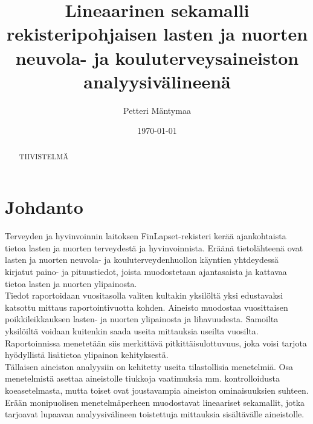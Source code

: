 \documentclass[finnish]{docopts}
\begin{document}
\singlespacing

\title{Lineaarinen sekamalli rekisteripohjaisen lasten ja nuorten neuvola- ja kouluterveysaineiston analyysivälineenä}
\author{Petteri Mäntymaa}
\date{\today}

\maketitle




\begin{abstract}

TIIVISTELMÄ

\end{abstract}

\mytableofcontents

\section{Johdanto}
\label{sec:johdanto}

Terveyden ja hyvinvoinnin laitoksen FinLapset-rekisteri \cite{finlapsetrekisteri} kerää ajankohtaista tietoa lasten ja nuorten terveydestä ja hyvinvoinnista. Eräänä tietolähteenä ovat lasten ja nuorten neuvola- ja kouluterveydenhuollon käyntien yhtdeydessä kirjatut paino- ja pituustiedot, joista muodostetaan ajantasaista ja kattavaa tietoa lasten ja nuorten ylipainosta.\\

Tiedot raportoidaan vuositasolla valiten kultakin yksilöltä yksi edustavaksi katsottu mittaus raportointivuotta kohden. Aineisto muodostaa vuosittaisen poikkileikkauksen lasten- ja nuorten ylipainosta ja lihavuudesta. Samoilta yksilöiltä voidaan kuitenkin saada useita mittauksia useilta vuosilta. Raportoinnissa menetetään siis merkittävä pitkittäisulottuvuus, joka voisi tarjota hyödyllistä lisätietoa ylipainon kehityksestä.\\

Tällaisen aineiston analyysiin on kehitetty useita tilastollisia menetelmiä. Osa menetelmistä asettaa aineistolle tiukkoja vaatimuksia mm. kontrolloidusta koeasetelmasta, mutta toiset ovat joustavampia aineiston ominaisuuksien suhteen. Erään monipuolisen menetelmäperheen muodostavat lineaariset sekamallit, jotka tarjoavat lupaavan analyysivälineen toistettuja mittauksia sisältävälle aineistolle.\\
\end{document}
